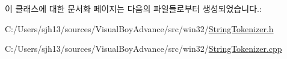 이 클래스에 대한 문서화 페이지는 다음의 파일들로부터 생성되었습니다.\+:\begin{DoxyCompactItemize}
\item 
C\+:/\+Users/sjh13/sources/\+Visual\+Boy\+Advance/src/win32/\mbox{\hyperlink{_string_tokenizer_8h}{String\+Tokenizer.\+h}}\item 
C\+:/\+Users/sjh13/sources/\+Visual\+Boy\+Advance/src/win32/\mbox{\hyperlink{_string_tokenizer_8cpp}{String\+Tokenizer.\+cpp}}\end{DoxyCompactItemize}
